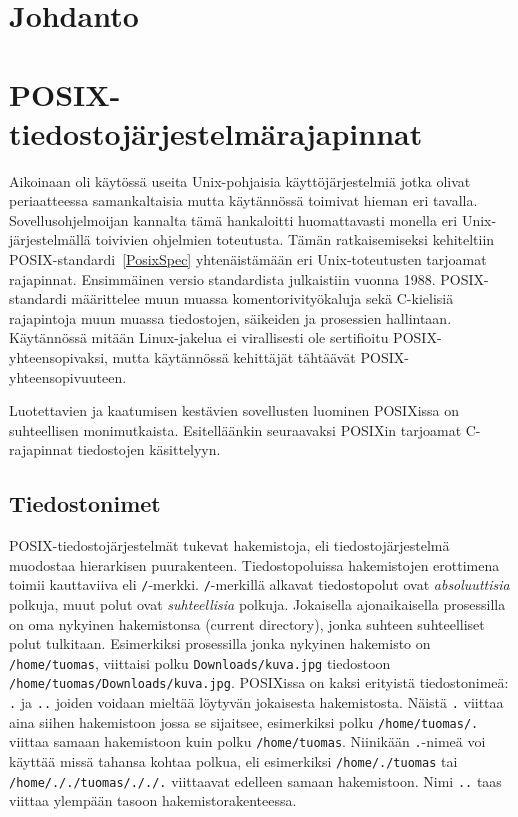 \section{Johdanto}

\section{POSIX-tiedostojärjestelmärajapinnat}

Aikoinaan oli käytössä useita Unix-pohjaisia käyttöjärjestelmiä jotka olivat periaatteessa samankaltaisia mutta käytännössä toimivat hieman eri tavalla.
Sovellusohjelmoijan kannalta tämä hankaloitti huomattavasti monella eri Unix-järjestelmällä toivivien ohjelmien toteutusta.
Tämän ratkaisemiseksi kehiteltiin POSIX-standardi~\ref{PosixSpec} yhtenäistämään eri Unix-toteutusten tarjoamat rajapinnat.
Ensimmäinen versio standardista julkaistiin vuonna 1988.
POSIX-standardi määrittelee muun muassa komentorivityökaluja sekä C-kielisiä rajapintoja muun muassa tiedostojen, säikeiden ja prosessien hallintaan.
Käytännössä mitään Linux-jakelua ei virallisesti ole sertifioitu POSIX-yhteensopivaksi,
mutta käytännössä kehittäjät tähtäävät POSIX-yhteensopivuuteen.

Luotettavien ja kaatumisen kestävien sovellusten luominen POSIXissa on suhteellisen monimutkaista.
Esitelläänkin seuraavaksi POSIXin tarjoamat C-rajapinnat tiedostojen käsittelyyn.

\subsection{Tiedostonimet}
POSIX-tiedostojärjestelmät tukevat hakemistoja, eli tiedostojärjestelmä muodostaa hierarkisen puurakenteen.
Tiedostopoluissa hakemistojen erottimena toimii kauttaviiva eli \texttt{/}-merkki.
\texttt{/}-merkillä alkavat tiedostopolut ovat \emph{absoluuttisia} polkuja,
muut polut ovat \emph{suhteellisia} polkuja.
Jokaisella ajonaikaisella prosessilla on oma nykyinen hakemistonsa (current directory),
jonka suhteen suhteelliset polut tulkitaan.
Esimerkiksi prosessilla jonka nykyinen hakemisto on \texttt{/home/tuomas},
viittaisi polku \texttt{Downloads/kuva.jpg} tiedostoon \texttt{/home/tuomas/Downloads/kuva.jpg}.
POSIXissa on kaksi erityistä tiedostonimeä: \texttt{.} ja \texttt{..} joiden voidaan mieltää löytyvän jokaisesta hakemistosta.
Näistä \texttt{.} viittaa aina siihen hakemistoon jossa se sijaitsee,
esimerkiksi polku \texttt{/home/tuomas/.} viittaa samaan hakemistoon kuin polku \texttt{/home/tuomas}.
Niinikään \texttt{.}-nimeä voi käyttää missä tahansa kohtaa polkua,
eli esimerkiksi \texttt{/home/./tuomas} tai \texttt{/home/././tuomas/././.} viittaavat edelleen samaan hakemistoon.
Nimi \texttt{..} taas viittaa ylempään tasoon hakemistorakenteessa.

